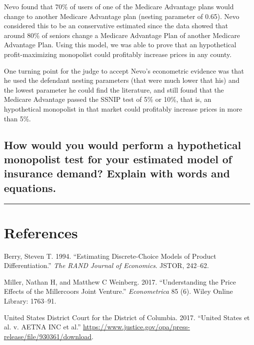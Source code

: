 \documentclass[]{article}
\begin{document}
Nevo found that 70\% of users of one of the Medicare Advantage plans
would change to another Medicare Advantage plan (nesting parameter of
0.65). Nevo considered this to be an conservative estimated since the
data showed that around 80\% of seniors change a Medicare Advantage Plan
of another Medicare Advantage Plan. Using this model, we was able to
prove that an hypothetical profit-maximizing monopolist could profitably
increase prices in any county.

One turning point for the judge to accept Nevo's econometric evidence
was that he used the defendant nesting parameters (that were much lower
that his) and the lowest parameter he could find the literature, and
still found that the Medicare Advantage passed the SSNIP test of 5\% or
10\%, that is, an hypothetical monopolist in that market could
profitably increase prices in more than 5\%.

\hypertarget{how-would-you-would-perform-a-hypothetical-monopolist-test-for-your-estimated-model-of-insurance-demand-explain-with-words-and-equations.}{%
\subsection{How would you would perform a hypothetical monopolist test
for your estimated model of insurance demand? Explain with words and
equations.}\label{how-would-you-would-perform-a-hypothetical-monopolist-test-for-your-estimated-model-of-insurance-demand-explain-with-words-and-equations.}}

\begin{center}\rule{0.5\linewidth}{\linethickness}\end{center}

\hypertarget{references}{%
\section*{References}\label{references}}

\hypertarget{refs}{}
\leavevmode\hypertarget{ref-berry1994}{}%
Berry, Steven T. 1994. ``Estimating Discrete-Choice Models of Product
Differentiation.'' \emph{The RAND Journal of Economics}. JSTOR, 242--62.

\leavevmode\hypertarget{ref-miller2017}{}%
Miller, Nathan H, and Matthew C Weinberg. 2017. ``Understanding the
Price Effects of the Millercoors Joint Venture.'' \emph{Econometrica} 85
(6). Wiley Online Library: 1763--91.

\leavevmode\hypertarget{ref-aetna}{}%
United States District Court for the District of Columbia. 2017.
``United States et al. v. AETNA INC et al.''
\url{https://www.justice.gov/opa/press-release/file/930361/download}.
\end{document}
